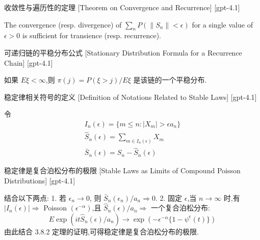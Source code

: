 \documentclass[UTF8]{ctexart}
\begin{document}
    \begin{thm}
        {收敛性与遍历性的定理}
        [Theorem on Convergence and Recurrence]
        [gpt-4.1]
        
The convergence (resp. divergence) of $\sum_{n} P(\|S_n\| < \epsilon)$ for a single value of $\epsilon > 0$ is sufficient for transience (resp. recurrence).

    \end{thm}
    
    
    
    \begin{thm}
        {可递归链的平稳分布公式}
        [Stationary Distribution Formula for a Recurrence Chain]
        [gpt-4.1]
        
如果 $E \xi < \infty$,则 $\pi(j) = P(\xi > j) / E \xi$ 是该链的一个平稳分布.

    \end{thm}
    
    
    
    \begin{dfn}
        {稳定律相关符号的定义}
        [Definition of Notations Related to Stable Laws]
        [gpt-4.1]
        
令
\[
\begin{array}{l}
{\displaystyle I_{n}(\epsilon) = \{ m \leq n : | X_{m} | > \epsilon a_{n} \}} \\
{\displaystyle \hat{S}_{n}(\epsilon) = \sum_{m \in I_{n}(\epsilon)} X_{m}} \\
{\displaystyle \bar{S}_{n}(\epsilon) = S_{n} - \hat{S}_{n}(\epsilon)}
\end{array}
\]

    \end{dfn}
    
    
    
    \begin{thm}
        {稳定律是复合泊松分布的极限}
        [Stable Laws as Limits of Compound Poisson Distributions]
        [gpt-4.1]
        
结合以下两点:
1. 若 $\epsilon_n \to 0$, 则 $\bar{S}_n(\epsilon_n)/a_n \Rightarrow 0$.
2. 固定 $\epsilon$,当 $n \to \infty$ 时,有 $|I_n(\epsilon)| \Rightarrow$ Poisson $(\epsilon^{-\alpha})$,且 $\hat{S}_n(\epsilon)/a_n \Rightarrow$ 一个复合泊松分布:
\[
E \exp ( i t \hat{S}_{n}(\epsilon) / a_{n} ) \to \exp ( - \epsilon^{-\alpha} \{ 1 - \psi^{\epsilon}(t) \} )
\]
由此结合 3.8.2 定理的证明,可得稳定律是复合泊松分布的极限.

    \end{thm}
    
\end{document}
